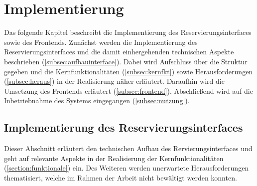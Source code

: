 
\chapter{Implementierung}
\label{chapter-implementierung}
Das folgende Kapitel beschreibt die Implementierung des Reservierungsinterfaces sowie des Frontends.
Zunächst werden die Implementierung des Reservierungsinterfaces und die damit einhergehenden
technischen Aspekte beschrieben (\ref{subsec:aufbauinterface}). Dabei wird Aufschluss über die
Struktur gegeben und die Kernfunktionalitäten (\ref{subsec:kernfkt}) sowie Herausforderungen
(\ref{subsec:heraus}) in der Realisierung näher erläutert. Daraufhin wird die Umsetzung des
Frontends erläutert (\ref{subsec:frontend}). Abschließend wird auf die Inbetriebnahme des Systems
eingegangen (\ref{subsec:nutzung}).

\section{Implementierung des Reservierungsinterfaces}
\label{sec:interface}
Dieser Abschnitt erläutert den technischen Aufbau des Rervierungsinterfaces und geht auf relevante
Aspekte in der Realisierung der Kernfunktionalitäten (\ref{section:funktionale}) ein. Des Weiteren
werden unerwartete Herausforderungen thematisiert, welche im Rahmen der Arbeit nicht bewältigt
werden konnten.


